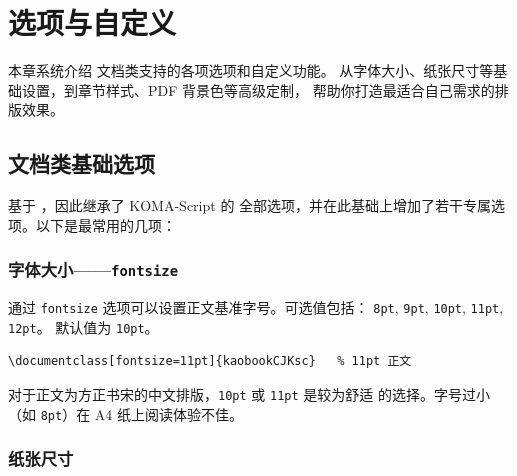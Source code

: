 
\setchapterpreamble[u]{\margintoc}
\chapter{选项与自定义}

本章系统介绍  文档类支持的各项选项和自定义功能。
从字体大小、纸张尺寸等基础设置，到章节样式、PDF 背景色等高级定制，
帮助你打造最适合自己需求的排版效果。


\section{文档类基础选项}


 基于 ，因此继承了 KOMA-Script 的
全部选项，并在此基础上增加了若干专属选项。以下是最常用的几项：

\subsection{字体大小——\texttt{fontsize}}

通过 \texttt{fontsize} 选项可以设置正文基准字号。可选值包括：
\texttt{8pt}, \texttt{9pt}, \texttt{10pt}, \texttt{11pt}, \texttt{12pt}。
默认值为 \texttt{10pt}。

\begin{lstlisting}
\documentclass[fontsize=11pt]{kaobookCJKsc}   % 11pt 正文
\end{lstlisting}

\begin{kaobox}[title=排版建议]
对于正文为方正书宋的中文排版，\texttt{10pt} 或 \texttt{11pt} 是较为舒适
的选择。字号过小（如 \texttt{8pt}）在 A4 纸上阅读体验不佳。
\end{kaobox}

\subsection{纸张尺寸}

